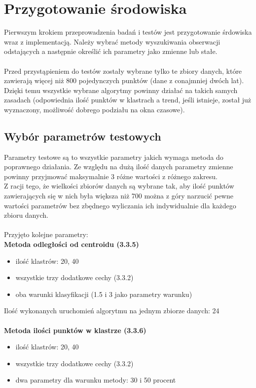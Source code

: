 \documentclass[eng,printmode]{mgr}
\begin{document}
\section{Przygotowanie środowiska}
Pierwszym krokiem przeprowadzenia badań i testów jest przygotowanie śrdowiska wraz z implementacją. Należy wybrać metody wyszukiwania obserwacji odstających a następnie określić ich parametry jako zmienne lub stałe.
\\\\
Przed przystąpieniem do testów zostały wybrane tylko te zbiory danych, które zawierają więcej niż 800 pojedynczych punktów (dane z conajmniej dwóch lat). Dzięki temu wszystkie wybrane algorytmy powinny działać na takich samych zasadach (odpowiednia ilość punktów w klastrach a trend, jeśli istnieje, został już wyznaczony, możliwość dobrego podziału na okna czasowe).
\subsection{Wybór parametrów testowych}
Parametry testowe są to wszystkie parametry jakich wymaga metoda do poprawnego działania. Ze względu na dużą ilość danych parametry zmienne powinny przyjmować maksymalnie 3 różne wartości z różnego zakresu.\\
Z racji tego, że wielkości zbiorów danych są wybrane tak, aby ilość punktów zawierających się w nich była większa niż 700 można z góry narzucić pewne wartości parametrów bez zbędnego wyliczania ich indywidualnie dla każdego zbioru danych.
\\\\
Przyjęto kolejne parametry:\\
\textbf{Metoda odległości od centroidu (3.3.5)}
\begin{itemize}
	\item ilość klastrów: 20, 40
	\item wszystkie trzy dodatkowe cechy (3.3.2)
	\item oba warunki klasyfikacji (1.5 i 3 jako parametry warunku)
\end{itemize}
Ilość wykonanych uruchomień algorytmu na jednym zbiorze danych: 24
\\\\
\textbf{Metoda ilości punktów w klastrze (3.3.6)}
\begin{itemize}
	\item ilość klastrów: 20, 40
	\item wszystkie trzy dodatkowe cechy (3.3.2)
	\item dwa parametry dla warunku metody: 30 i 50 procent
\end{itemize}
\end{document}
